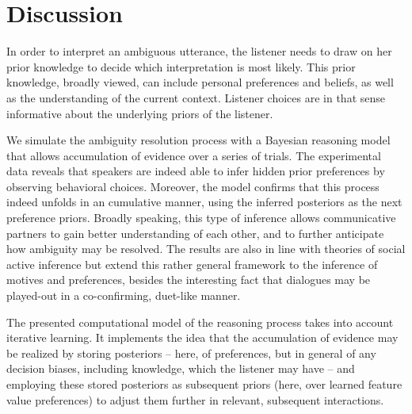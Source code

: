\documentclass[10pt,a4paper]{article}
\begin{document}
%

\section{Discussion}

In order to interpret an ambiguous utterance, the listener needs to draw on her prior knowledge to decide which interpretation is most likely. This prior knowledge, broadly viewed, can include personal preferences and beliefs, as well as the understanding of the current context. Listener choices are in that sense informative about the underlying priors of the listener. 

We simulate the ambiguity resolution process with a Bayesian reasoning model that allows accumulation of evidence over a series of trials. The experimental data reveals that speakers are indeed able to infer hidden prior preferences by observing behavioral choices. Moreover, the model confirms that this process indeed unfolds in an cumulative manner, using the inferred posteriors as the next preference priors. 
Broadly speaking, this type of inference allows communicative partners to gain better understanding of each other, and to further anticipate how ambiguity may be resolved.
The results are also in line with theories of social active inference \cite{Friston:2015b} but extend this rather general framework to the inference of motives and preferences, besides the interesting fact that dialogues may be played-out in a co-confirming, duet-like manner. 


The presented computational model of the reasoning process takes into account iterative learning. It implements the idea that the accumulation of evidence may be realized by storing posteriors -- here, of preferences, but in general of any decision biases, including knowledge, which the listener may have -- and employing these stored posteriors as subsequent priors (here, over learned feature value preferences) to adjust them further in relevant, subsequent interactions. 
\end{document}

